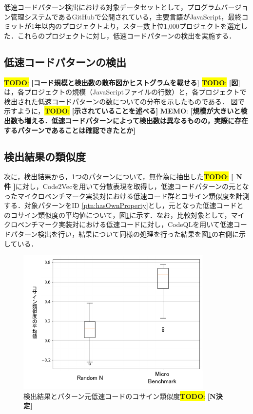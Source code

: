 \documentclass[submit,techrep,noauthor]{ipsj}
\newcommand{\todo}[1]{\colorbox{yellow}{{\bf TODO}:}{\color{red} {\textbf{[#1]}}}}
\newcommand{\memo}[1]{\colorbox{magenta!30}{{\bf MEMO}:}{\color{red!50} {\textbf{[#1]}}}}
\begin{document}
低速コードパターン検出における対象データセットとして，プログラムバージョン管理システムであるGitHubで公開されている，主要言語がJavaScript，最終コミットが1年以内のプロジェクトより，スター数上位1,000プロジェクトを選定した．これらのプロジェクトに対し，低速コードパターンの検出を実施する．

\subsection{低速コードパターンの検出}

\todo{コード規模と検出数の散布図かヒストグラムを載せる}
\todo{図}は，各プロジェクトの規模（JavaScriptファイルの行数）と，各プロジェクトで検出された低速コードパターンの数についての分布を示したものである．
図で示すように，\todo{示されていることを述べる}
\memo{規模が大きいと検出数も増える．低速コードパターンによって検出数は異なるものの，実際に存在するパターンであることは確認できたとか}



\subsection{検出結果の類似度}

次に，検出結果から，1つのパターンについて，無作為に抽出した\todo{ N 件 }に対し，Code2Vecを用いて分散表現を取得し，低速コードパターンの元となったマイクロベンチマーク実装対における低速コード群とコサイン類似度を計測する．対象パターンをID \ref{ptn:hasOwnProperty}とし，元となった低速コードとのコサイン類似度の平均値について，図\ref{fig:boxplot_cosine}に示す．なお，比較対象として，マイクロベンチマーク実装対における低速コードに対し，CodeQLを用いて低速コードパターン検出を行い，結果について同様の処理を行った結果を図\ref{fig:boxplot_cosine}の右側に示している．

\begin{figure}[t]
    \centering
    \includegraphics[width=0.9\linewidth]{./Noguchi_fig/boxplot_compare.pdf}
    \caption{検出結果とパターン元低速コードのコサイン類似度\todo{N決定}}
    \label{fig:boxplot_cosine}
\end{figure}
\end{document}
